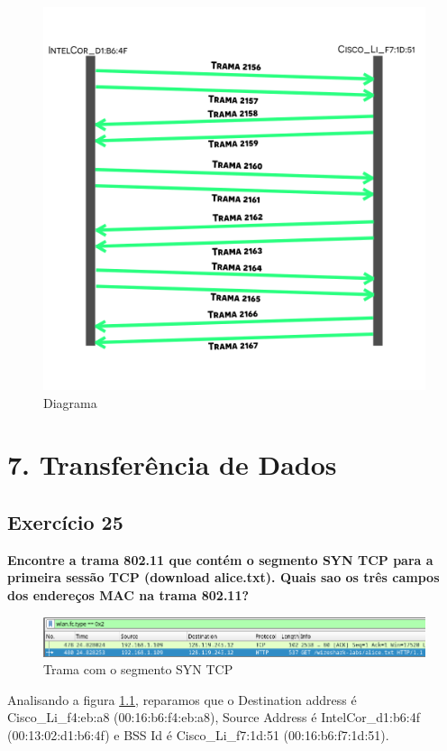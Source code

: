 \documentclass[a4paper]{report}
\begin{document}
\begin{figure}[H]
    \centering 
    \includegraphics[width=\textwidth]{images/diagramaEx24.png}  
    \caption{Diagrama}
    \label{fig:diagramaEx24}
\end{figure}

\chapter{7. Transferência de Dados}

\section{Exercício 25}
\textbf{Encontre a trama 802.11 que contém o segmento SYN TCP para a primeira
sessão TCP (download alice.txt). Quais sao os três campos dos endereços MAC
na trama 802.11?}\\

\begin{figure}[H]
    \centering 
    \includegraphics[width=\textwidth]{images/tramaEx25.png}  
    \caption{Trama com o segmento SYN TCP}
    \label{fig:tramaEx25}
\end{figure}
Analisando a figura \ref{fig:tramaEx25}, reparamos que o Destination address é
Cisco\_Li\_f4:eb:a8 (00:16:b6:f4:eb:a8), Source Address é IntelCor\_d1:b6:4f 
(00:13:02:d1:b6:4f) e BSS Id é Cisco\_Li\_f7:1d:51 (00:16:b6:f7:1d:51).
\end{document}
